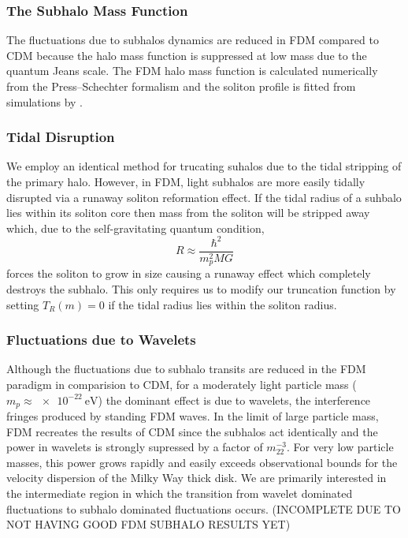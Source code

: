 \documentclass[usenatbib]{mnras}
\begin{document}
\subsubsection{The Subhalo Mass Function}

The fluctuations due to subhalos dynamics are reduced in FDM compared to CDM because the halo mass function is suppressed at low mass due to the quantum Jeans scale. The FDM halo mass function is calculated numerically from the Press--Schechter formalism \citep{substructure_FDM, marsh} and the soliton profile is fitted from simulations by \cite{schive_solitons}. 


\subsubsection{Tidal Disruption}

We employ an identical method for trucating suhalos due to the tidal stripping of the primary halo. However, in FDM, light subhalos are more easily tidally disrupted via a runaway soliton reformation effect. If the tidal radius of a suhbalo lies within its soliton core then mass from the soliton will be stripped away which, due to the self-gravitating quantum condition,
\begin{equation}
R \approx \frac{\hbar^2}{m_p^2 M G}
\end{equation} 
forces the soliton to grow in size causing a runaway effect which completely destroys the subhalo. This only requires us to modify our truncation function by setting $T_R(m) = 0$ if the tidal radius lies within the soliton radius. 


\subsubsection{Fluctuations due to Wavelets}

Although the fluctuations due to subhalo transits are reduced in the FDM paradigm in comparision to CDM, for a moderately light particle mass ($m_p \approx \SI{e-22}{\electronvolt}$) the dominant effect is due to wavelets, the interference fringes produced by standing FDM waves. In the limit of large particle mass, FDM recreates the results of CDM since the subhalos act identically and the power in wavelets is strongly supressed by a factor of $m_{22}^{-3}$. For very low particle masses, this power grows rapidly and easily exceeds observational bounds for the velocity dispersion of the Milky Way thick disk. We are primarily interested in the intermediate region in which the transition from wavelet dominated fluctuations to subhalo dominated fluctuations occurs. (INCOMPLETE DUE TO NOT HAVING GOOD FDM SUBHALO RESULTS YET)
\end{document}
